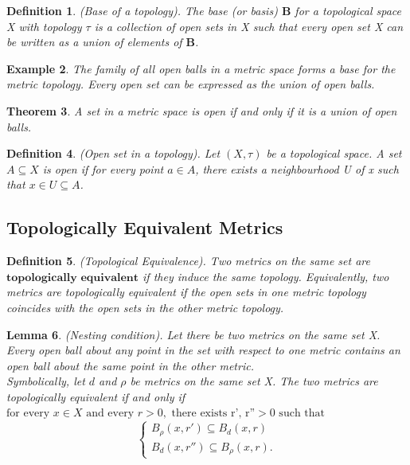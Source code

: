 \documentclass[twoside]{article}
\newcounter{lecnum}
\newtheorem{theorem}{Theorem}[lecnum]
\newtheorem{lemma}[theorem]{Lemma}
\newtheorem{definition}[theorem]{Definition}
\newtheorem{example}[theorem]{Example}
\begin{document}
\begin{definition}(Base of a topology). The base (or basis) $\textbf{B}$ for a topological space X with topology $\tau$ is a collection of open sets in X such that every open set X can be written as a union of elements of $\textbf{B}$.
\end{definition}

\begin{example} The family of all open balls in a metric space forms a base for the metric topology. Every open set can be expressed as the union of open balls.
\end{example}

\begin{theorem}A set in a metric space is open if and only if it is a union of open balls.
\end{theorem}

\begin{definition}(Open set in a topology). Let $(X, \tau)$ be a topological space. A set $A \subseteq X$ is open if for every point $a \in A$, there exists a neighbourhood U of x such that $x \in U \subseteq A$. 
\end{definition}

\subsection{Topologically Equivalent Metrics}
\begin{definition}(Topological Equivalence). Two metrics on the same set are $\textbf{topologically equivalent}$ if they induce the same topology. Equivalently, two metrics are topologically equivalent if the open sets in one metric topology coincides with the open sets in the other metric topology.
\end{definition}

\begin{lemma}(Nesting condition). Let there be two metrics on the same set X. Every open ball about any point in the set with respect to one metric contains an open ball about the same point in the other metric. \\Symbolically, let $d$ and $\rho$ be metrics on the same set X. The two metrics are topologically equivalent if and only if $\text{for every } x \in X \text{ and every } r > 0, \text{ there exists r', r''} > 0 \text{ such that}$
$$
\begin{cases}
B_{\rho}(x,r') \subseteq B_d(x,r) \\
B_{d}(x,r'') \subseteq B_{\rho}(x,r).
\end{cases}
$$
\end{lemma}
\end{document}
